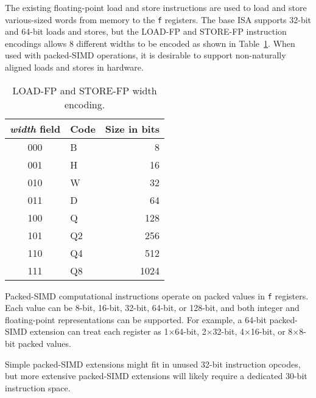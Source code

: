 The existing floating-point load and store instructions are used to
load and store various-sized words from memory to the {\tt f}
registers.  The base ISA supports 32-bit and 64-bit loads and stores,
but the LOAD-FP and STORE-FP instruction encodings allows 8 different
widths to be encoded as shown in Table~\ref{psimdwidth}.  When used
with packed-SIMD operations, it is desirable to support non-naturally
aligned loads and stores in hardware.

\begin{table}[htp]
\begin{center}
\begin{tabular}{|c|l|r|}
\hline
{\em width} field &
Code &
Size in bits\\
\hline
000 & B  &  8   \\
001 & H  & 16   \\
010 & W  & 32   \\
011 & D  & 64   \\
100 & Q  & 128  \\
101 & Q2 & 256  \\
110 & Q4 & 512  \\
111 & Q8 & 1024 \\
\hline
\end{tabular}
\end{center}
\caption{LOAD-FP and STORE-FP width encoding.}
\label{psimdwidth}
\end{table}

Packed-SIMD computational instructions operate on packed values in
{\tt f} registers.  Each value can be 8-bit, 16-bit, 32-bit, 64-bit,
or 128-bit, and both integer and floating-point representations can be
supported.  For example, a 64-bit packed-SIMD extension can treat each
register as 1$\times$64-bit, 2$\times$32-bit, 4$\times$16-bit, or
8$\times$8-bit packed values.

\begin{commentary}
Simple packed-SIMD extensions might fit in unused 32-bit instruction
opcodes, but more extensive packed-SIMD extensions will likely require
a dedicated 30-bit instruction space.
\end{commentary}
